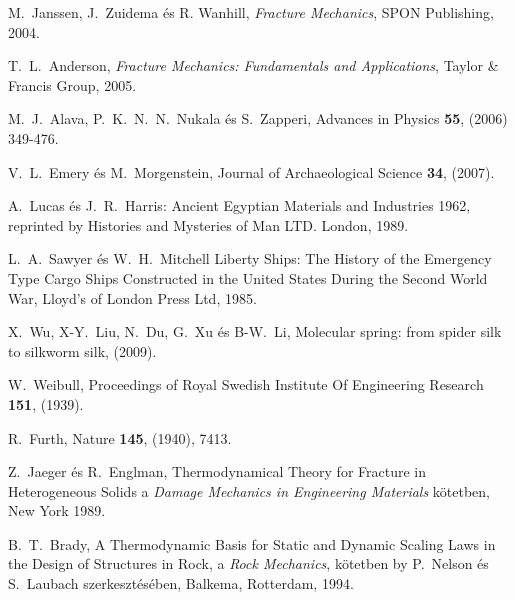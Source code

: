 \begin{thebibliography}{200}
\vspace*{-0.3cm} 
 M.\ Janssen, J.\ Zuidema \'es R. Wanhill, {\it Fracture Mechanics}, SPON Publishing, 2004.

\vspace*{-0.3cm} 
 T.\ L.\ Anderson, {\it Fracture Mechanics: Fundamentals and Applications}, Taylor \& Francis Group, 2005.

\vspace*{-0.3cm} 
 M.\ J.\ Alava, P.\ K.\ N.\ N.\ Nukala \'es S.\ Zapperi, Advances in Physics {\bf 55}, (2006) 349-476.

\vspace*{-0.3cm}
 V.\ L.\ Emery \'es M.\ Morgenstein, Journal of Archaeological Science {\bf 34}, (2007).

\vspace*{-0.3cm}
 A.\ Lucas \'es J.\ R.\ Harris: Ancient Egyptian Materials and Industries 1962, reprinted by Histories and Mysteries of Man LTD. London, 1989.

\vspace*{-0.3cm}
 L.\ A.\ Sawyer \'es W.\ H.\ Mitchell Liberty Ships: The History of the Emergency Type Cargo Ships Constructed in the United States During the Second World War, Lloyd's of London Press Ltd, 1985.

\vspace*{-0.3cm}
 X.\ Wu, X-Y.\ Liu, N.\ Du, G.\ Xu \'es B-W.\ Li, Molecular spring: from spider silk to silkworm silk, (2009).


\vspace*{-0.3cm}
 W.\ Weibull, Proceedings of Royal Swedish Institute Of Engineering Research {\bf 151}, (1939).

\vspace*{-0.3cm}
 R.\ Furth, Nature {\bf 145}, (1940), 7413.

\vspace*{-0.3cm}
 Z.\ Jaeger \'es R.\ Englman, Thermodynamical Theory for Fracture in Heterogeneous Solids a {\it Damage Mechanics in Engineering Materials} k\"{o}tetben, New York 1989.

\vspace*{-0.3cm}
 B.\ T.\ Brady, A Thermodynamic Basis for Static and Dynamic Scaling Laws in the Design of Structures in Rock, a {\it Rock Mechanics}, k\"{o}tetben by P.\ Nelson \'es S.\ Laubach szerkeszt\'es\'eben, Balkema, Rotterdam, 1994.


\end{thebibliography}
